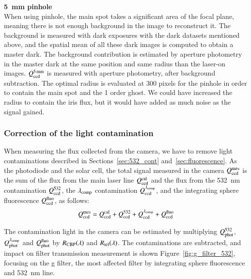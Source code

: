 \textbf{5~mm pinhole} \\

When using \bpinhole pinhole, the main spot takes a significant area of the focal plane, meaning there is not enough background in the image to reconstruct it. The background is measured with dark exposures with the dark datasets mentioned above, and the spatial mean of all these dark images is computed to obtain a master dark. The background contribution is estimated by aperture photometry in the master dark at the same position and same radius than the laser-on images. $Q_{\mathrm{ccd}}^{\SI{5}{\milli\meter}}$ is measured with aperture photometry, after background subtraction. The optimal radius is evaluated at 300 pixels for the \bpinhole pinhole in order to contain the main spot and the 1 order ghost. We could have increased the radius to contain the iris flux, but it would have added as much noise as the signal gained. 

\subsubsection{Correction of the light contamination}\label{sec:sd_contaminations}

When measuring the flux collected from the \SD camera, we have to remove light contaminations described in Sections~\ref{sec:532_cont} and~\ref{sec:fluorescence}. As the photodiode and the solar cell, the total signal measured in the \SD camera $Q_{\mathrm{ccd}}^{\mathrm{mes}}$ is the sum of the flux from the main laser line $Q_{\mathrm{ccd}}^{\mathrm{cal}}$ and the flux from the \SI{532}{\nm} contamination $Q_{\mathrm{ccd}}^{532}$, the $\lambda_{\rm comp}$ contamination $Q_{\mathrm{ccd}}^{\lambda_{\rm comp}}$, and the integrating sphere fluorescence $Q_{\mathrm{ccd}}^{\mathrm{fluo}}$, as follows:
\begin{equation}
    Q_{\mathrm{ccd}}^{\mathrm{mes}} = Q_{\mathrm{ccd}}^{\mathrm{cal}} + Q_{\mathrm{ccd}}^{532} + Q_{\mathrm{ccd}}^{\lambda_{\rm comp}} + Q_{\mathrm{ccd}}^{\mathrm{fluo}}
    \label{eq:qccd_mes}
\end{equation}

The contamination light in the \SD camera can be estimated by multiplying $Q_{\mathrm{phot}}^{532}$, $Q_{\mathrm{phot}}^{\lambda_{\rm comp}}$ and $Q_{\mathrm{phot}}^{\mathrm{fluo}}$ by $R_{\mathrm{CBP}}(\lambda)$ and $R_{\mathrm{tel}}(\lambda)$. The contaminations are subtracted, and impact on filter transmission measurement is shown Figure~\ref{fig:g_filter_532}, focusing on the \SD g filter, the most affected filter by integrating sphere fluorescence and \SI{532}{\nano\meter} line.


